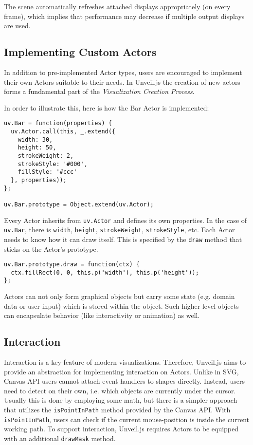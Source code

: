 \begin{english}
\SuperPar The scene automatically refreshes attached displays appropriately (on every frame), which implies that performance may decrease if multiple output displays are used.

\subsection{Implementing Custom Actors}

In addition to pre-implemented Actor types, users are encouraged to implement their own Actors suitable to their needs. In Unveil.js the creation of new actors forms a fundamental part of the \emph{Visualization Creation Process}.

\SuperPar In order to illustrate this, here is how the Bar Actor is implemented:

\begin{verbatim}
uv.Bar = function(properties) {
  uv.Actor.call(this, _.extend({
    width: 30,
    height: 50,
    strokeWeight: 2,
    strokeStyle: '#000',
    fillStyle: '#ccc'
  }, properties));
};

uv.Bar.prototype = Object.extend(uv.Actor);
\end{verbatim}

\SuperPar Every Actor inherits from \texttt{uv.Actor} and defines its own properties. In the case of \texttt{uv.Bar}, there is \texttt{width}, \texttt{height}, \texttt{strokeWeight}, \texttt{strokeStyle}, etc. Each Actor needs to know how it can draw itself. This is specified by the \texttt{draw} method that sticks on the Actor's prototype.

\begin{verbatim}
uv.Bar.prototype.draw = function(ctx) {
  ctx.fillRect(0, 0, this.p('width'), this.p('height'));
};
\end{verbatim}

\SuperPar Actors can not only form graphical objects but carry some state (e.g. domain data or user input) which is stored within the object. Such higher level objects can encapsulate behavior (like interactivity or animation) as well.


\subsection{Interaction}

Interaction is a key-feature of modern visualizations. Therefore, Unveil.js aims to provide an abstraction for implementing interaction on Actors. Unlike in SVG, Canvas API users cannot attach event handlers to shapes directly. Instead, users need to detect on their own, i.e. which objects are currently under the cursor. Usually this is done by employing some math, but there is a simpler approach that utilizes the \texttt{isPointInPath} method provided by the Canvas API. With \texttt{isPointInPath}, users can check if the current mouse-position is inside the current working path. To support interaction, Unveil.js requires Actors to be equipped with an additional \texttt{drawMask} method.


\end{english}
